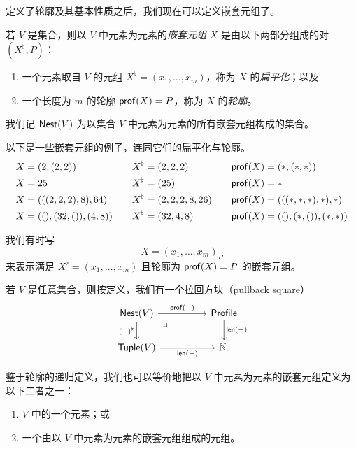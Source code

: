 定义了轮廓及其基本性质之后，我们现在可以定义嵌套元组了。

\begin{definition}\label{definitionofnestedtuple}
    若 $V$ 是集合，则以 $V$ 中元素为元素的{\it 嵌套元组} $X$ 是由以下两部分组成的对 $(X^\flat,P)$：
    \begin{enumerate}
        \item 一个元素取自 $V$ 的元组 $X^\flat = (x_1,\dots,x_m)$，称为 $X$ 的{\it 扁平化}；以及
        \item 一个长度为 $m$ 的轮廓 $\mathsf{prof}(X) = P$，称为 $X$ 的{\it 轮廓}。
    \end{enumerate}
    我们记 $\mathsf{Nest}(V)$ 为以集合 $V$ 中元素为元素的所有嵌套元组构成的集合。
\end{definition}

\begin{example} 以下是一些嵌套元组的例子，连同它们的扁平化与轮廓。
\[
\begin{aligned}
X &= (2,(2,2)) \quad & X^\flat &= (2,2,2) \quad & \mathsf{prof}(X) & = (*,(*,*)) \\
X & = 25 \quad & X^\flat & = (25) \quad & \mathsf{prof}(X) & = * \\
X & = (((2,2,2),8),64) \quad & X^\flat & = (2,2,2,8,26) \quad & \mathsf{prof}(X) & = (((*,*,*),*),*)\\
X & = ((),(32,()),(4,8)) \quad & X^\flat & = (32,4,8) \quad & \mathsf{prof}(X) & = ((),(*,()),(*,*))
\end{aligned}
\]
\end{example}

\begin{notation}
    我们有时写
    \[X = (x_1,\dots,x_m)_P\]
    来表示满足 $X^\flat = (x_1,\dots,x_m)$ 且轮廓为 $\mathsf{prof}(X) = P$ 的嵌套元组。
\end{notation}

\begin{observation}\label{nesttuplepullbacksquare}
    若 $V$ 是任意集合，则按定义，我们有一个拉回方块（pullback square）
    \[ \begin{tikzcd} 
    \mathterm{Nest}(V) \ar[rr,"\profile(-)"] \ar[d,swap,"(-)^\flat"] \arrow[drr, phantom, "\lrcorner", very near start] & & \mathterm{Profile} \ar[d,"\len(-)"] \\
    \mathterm{Tuple}(V) \ar[rr,swap,"\len(-)"] & & \mathbb{N}.
    \end{tikzcd} \]
\end{observation}


\begin{remark}
    鉴于轮廓的递归定义，我们也可以等价地把以 $V$ 中元素为元素的嵌套元组定义为以下二者之一：
    \begin{enumerate}
        \item $V$ 中的一个元素；或
        \item 一个由以 $V$ 中元素为元素的嵌套元组组成的元组。
    \end{enumerate}
\end{remark}

